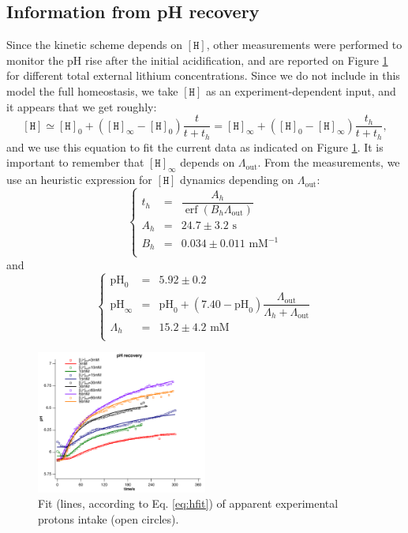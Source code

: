 \documentclass[aps,onecolumn,11pt]{revtex4}
\newcommand{\mychem}[1]{\mathtt{#1}}
\newcommand{\myconc}[1]{\left\lbrack{#1}\right\rbrack}
\newcommand{\spproton}{\mychem{H}}
\newcommand{\proton}{\myconc{\spproton}}
\newcommand{\LiAll}{\Lambda}
\newcommand{\LiAllOut}{{\LiAll}_{\mathrm{out}}}
\DeclareMathOperator\erf{erf}
\newcommand{\pH}{\ensuremath{\mathrm{pH}}}
\begin{document}
\subsection{Information from pH recovery}
Since the kinetic scheme depends on $\proton$, other measurements were performed to monitor the pH rise after the initial acidification, 
and are reported on Figure \ref{fig:protons} for different total external lithium concentrations. Since we do not include in this model the full homeostasis,
we take $\proton$ as an experiment-dependent input, and it appears that we get roughly:
\begin{equation}
\label{eq:hfit}
	\proton \simeq \proton_0 + \left(\proton_\infty-\proton_0\right) \dfrac{t}{t+t_h} = \proton_\infty + \left(\proton_0 - \proton_\infty\right) \dfrac{t_h}{t+t_h},
\end{equation}
and we use this equation to fit the current data as indicated on Figure \ref{fig:protons}. It is important to remember that $\proton_\infty$ depends on $\LiAllOut$.
From the measurements, we use an heuristic expression for $\proton$ dynamics depending on $\LiAllOut$:
\begin{equation}
\left\lbrace
\begin{array}{rcl}
t_h & = & \dfrac{A_h}{\erf\left(B_h\LiAllOut\right)}\\
A_h & = & 24.7      \pm 3.2 \text{ s}\\
B_h & = & 0.034     \pm 0.011\text{ mM}^{-1}\\ 
\end{array}
\right.
\end{equation}
and
\begin{equation}
\left\lbrace
\begin{array}{rcl}
\pH_0      & = & 5.92 \pm 0.2 \\
\pH_\infty & = & \pH_0 + \left(7.40-\pH_0\right) \dfrac{\LiAllOut}{\LiAll_h+\LiAllOut}\\
\LiAll_h   & = & 15.2\pm4.2\text{ mM}\\
\end{array}
\right.
\end{equation}


\begin{figure}[!ht]
\begin{center}
\includegraphics[width=0.5\textwidth]{protons.pdf}
\end{center}
\caption{\label{fig:protons} Fit (lines, according to Eq. \eqref{eq:hfit}) of apparent experimental protons intake (open circles).}
\end{figure}
\end{document}
